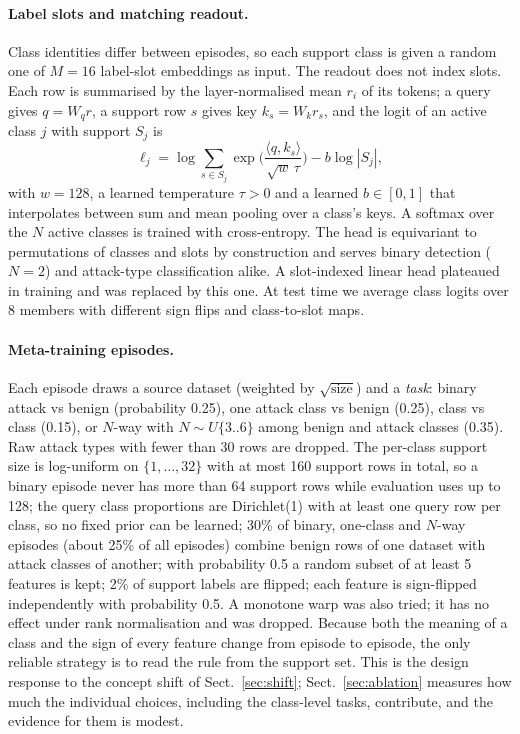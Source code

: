 \documentclass[11pt]{article}
\begin{document}
\paragraph{Label slots and matching readout.}
Class identities differ between episodes, so each support class is given a random one of $M=16$ label-slot embeddings as input.
The readout does not index slots.
Each row is summarised by the layer-normalised mean $r_i$ of its tokens; a query gives $q=W_q r$, a support row $s$ gives key $k_s=W_k r_s$, and the logit of an active class $j$ with support $S_j$ is
\begin{equation}
\ell_j=\log\!\!\sum_{s\in S_j}\exp\!\Big(\frac{\langle q,k_s\rangle}{\sqrt{w}\,\tau}\Big)-b\log|S_j|,
\end{equation}
with $w=128$, a learned temperature $\tau>0$ and a learned $b\in[0,1]$ that interpolates between sum and mean pooling over a class's keys.
A softmax over the $N$ active classes is trained with cross-entropy.
The head is equivariant to permutations of classes and slots by construction and serves binary detection ($N=2$) and attack-type classification alike.
A slot-indexed linear head plateaued in training and was replaced by this one.
At test time we average class logits over 8 members with different sign flips and class-to-slot maps.

\paragraph{Meta-training episodes.}
Each episode draws a source dataset (weighted by $\sqrt{\text{size}}$) and a \emph{task}: binary attack vs benign (probability 0.25), one attack class vs benign (0.25), class vs class (0.15), or $N$-way with $N\sim U\{3..6\}$ among benign and attack classes (0.35).
Raw attack types with fewer than 30 rows are dropped.
The per-class support size is log-uniform on $\{1,\dots,32\}$ with at most 160 support rows in total, so a binary episode never has more than 64 support rows while evaluation uses up to 128; the query class proportions are Dirichlet(1) with at least one query row per class, so no fixed prior can be learned; 30\% of binary, one-class and $N$-way episodes (about 25\% of all episodes) combine benign rows of one dataset with attack classes of another; with probability 0.5 a random subset of at least 5 features is kept; 2\% of support labels are flipped; each feature is sign-flipped independently with probability 0.5.
A monotone warp was also tried; it has no effect under rank normalisation and was dropped.
Because both the meaning of a class and the sign of every feature change from episode to episode, the only reliable strategy is to read the rule from the support set.
This is the design response to the concept shift of Sect.~\ref{sec:shift}; Sect.~\ref{sec:ablation} measures how much the individual choices, including the class-level tasks, contribute, and the evidence for them is modest.
\end{document}
